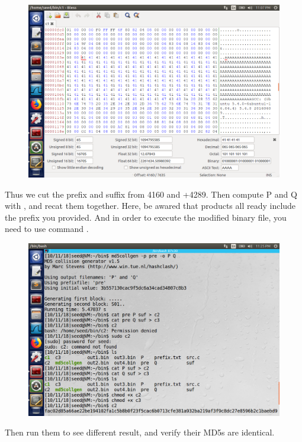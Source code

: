 \documentclass{article}
\begin{document}
\begin{figure}[H]\centering\includegraphics[width=\textwidth]{ss/11.png}\end{figure}
Thus we cut the prefix and suffix from 4160 and +4289. Then compute P and Q with , and recat them together. Here, be awared that  products all ready include the prefix you provided. And in order to execute the modified binary file, you need to use command .
\begin{figure}[H]\centering\includegraphics[width=\textwidth]{ss/12.png}\end{figure}
Then run them to see different result, and verify their MD5s are identical.
\end{document}
